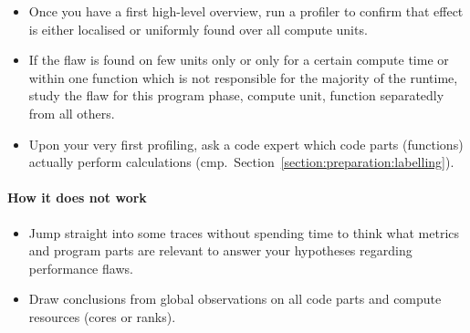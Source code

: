 \begin{itemize}[noitemsep]
  \item[$\boxplus$] Once you have a first high-level overview, run a profiler to
  confirm that effect is either localised or uniformly found over all compute
  units.
  \item[$\boxplus$] If the flaw is found on few units only or only for a certain
  compute time or within one function which is not responsible for the majority
  of the runtime, study the flaw for this program phase, compute unit, function
  separatedly from all others.
  \item[$\boxplus$] Upon your very first profiling, ask a code expert which code parts (functions) actually perform calculations (cmp.~Section~\ref{section:preparation:labelling}).
\end{itemize}


\paragraph*{How it does not work}

\begin{itemize}[noitemsep]
  \item[$\boxminus$] Jump straight into some traces without spending time to
  think what metrics and program parts are relevant to answer your
  hypotheses regarding  performance flaws.
  \item[$\boxminus$] Draw conclusions from global observations on all code parts
  and compute resources (cores or ranks).
\end{itemize}
